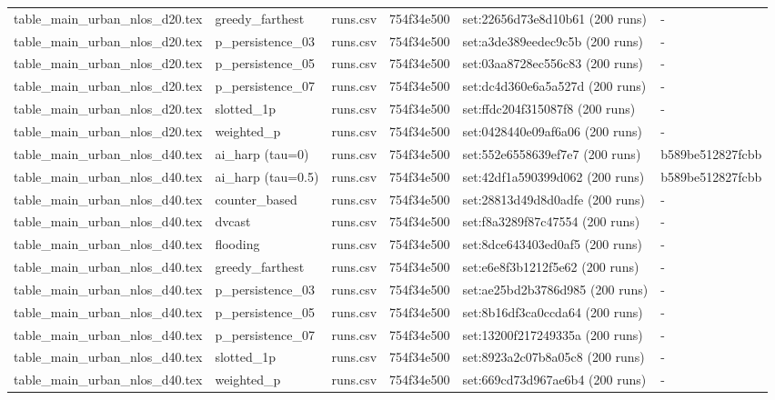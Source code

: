 \begin{tabular}{llllll}
table\_main\_urban\_nlos\_d20.tex & greedy\_farthest & runs.csv & 754f34e500 & set:22656d73e8d10b61 (200 runs) & - \\
table\_main\_urban\_nlos\_d20.tex & p\_persistence\_03 & runs.csv & 754f34e500 & set:a3de389eedec9c5b (200 runs) & - \\
table\_main\_urban\_nlos\_d20.tex & p\_persistence\_05 & runs.csv & 754f34e500 & set:03aa8728ec556c83 (200 runs) & - \\
table\_main\_urban\_nlos\_d20.tex & p\_persistence\_07 & runs.csv & 754f34e500 & set:dc4d360e6a5a527d (200 runs) & - \\
table\_main\_urban\_nlos\_d20.tex & slotted\_1p & runs.csv & 754f34e500 & set:ffdc204f315087f8 (200 runs) & - \\
table\_main\_urban\_nlos\_d20.tex & weighted\_p & runs.csv & 754f34e500 & set:0428440e09af6a06 (200 runs) & - \\
table\_main\_urban\_nlos\_d40.tex & ai\_harp (tau=0) & runs.csv & 754f34e500 & set:552e6558639ef7e7 (200 runs) & b589be512827fcbb \\
table\_main\_urban\_nlos\_d40.tex & ai\_harp (tau=0.5) & runs.csv & 754f34e500 & set:42df1a590399d062 (200 runs) & b589be512827fcbb \\
table\_main\_urban\_nlos\_d40.tex & counter\_based & runs.csv & 754f34e500 & set:28813d49d8d0adfe (200 runs) & - \\
table\_main\_urban\_nlos\_d40.tex & dvcast & runs.csv & 754f34e500 & set:f8a3289f87c47554 (200 runs) & - \\
table\_main\_urban\_nlos\_d40.tex & flooding & runs.csv & 754f34e500 & set:8dce643403ed0af5 (200 runs) & - \\
table\_main\_urban\_nlos\_d40.tex & greedy\_farthest & runs.csv & 754f34e500 & set:e6e8f3b1212f5e62 (200 runs) & - \\
table\_main\_urban\_nlos\_d40.tex & p\_persistence\_03 & runs.csv & 754f34e500 & set:ae25bd2b3786d985 (200 runs) & - \\
table\_main\_urban\_nlos\_d40.tex & p\_persistence\_05 & runs.csv & 754f34e500 & set:8b16df3ca0ccda64 (200 runs) & - \\
table\_main\_urban\_nlos\_d40.tex & p\_persistence\_07 & runs.csv & 754f34e500 & set:13200f217249335a (200 runs) & - \\
table\_main\_urban\_nlos\_d40.tex & slotted\_1p & runs.csv & 754f34e500 & set:8923a2c07b8a05c8 (200 runs) & - \\
table\_main\_urban\_nlos\_d40.tex & weighted\_p & runs.csv & 754f34e500 & set:669cd73d967ae6b4 (200 runs) & - \\

\end{tabular}

